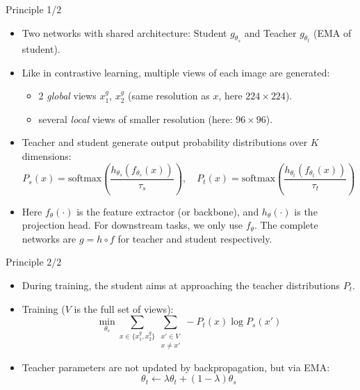 \documentclass[xcolor=pdftex,dvipsnames,table]{beamer}
\begin{document}
\begin{frame}{Principle 1/2}
\begin{itemize}
  \item Two networks with shared architecture: Student $g_{\theta_s}$ and Teacher $g_{\theta_t}$ (EMA of student).
  \item Like in contrastive learning, multiple views of each image are generated: 
  \begin{itemize}
   \item 2 \emph{global} views $x_1^g$, $x_2^g$ (same resolution as $x$, here $224 \times 224$).
   \item several \emph{local} views of smaller resolution (here: $96 \times 96$). 
  \end{itemize}
  \item Teacher and student generate output probability distributions over $K$ dimensions: 
  \[ P_s(x)=\mathrm{softmax}\!\left(\frac{h_{\theta_s}(f_{\theta_s}(x))}{\tau_s}\right),\quad
     P_t(x)=\mathrm{softmax}\!\left(\frac{h_{\theta_t}(f_{\theta_t}(x))}{\tau_t}\right) \]
    \item Here $f_{\theta}(\cdot)$ is the feature extractor (or backbone), and $h_{\theta}(\cdot)$ is the projection head. For downstream tasks, we only use $f_{\theta}$. The complete networks are $g = h\circ f$ for teacher and student respectively.
\end{itemize}
\end{frame}

\begin{frame}{Principle 2/2}
\begin{itemize}
  \item During training, the student aims at approaching the teacher distributions $P_t$. 
  \item Training ($V$ is the full set of views): 
  \begin{equation}
  \min_{\theta_s} \sum_{x \in \{ x_1^g, x_2^g\}} \sum_{\substack{x' \in V\\ x\neq x'}} - P_t(x)\log{P_s(x')}
  \end{equation}
  \item Teacher parameters are not updated by backpropagation, but via EMA: 
  \begin{equation}
   \theta _t \leftarrow \lambda \theta _t + (1-\lambda)\theta _s
  \end{equation}

\end{itemize}
\end{frame}
\end{document}
